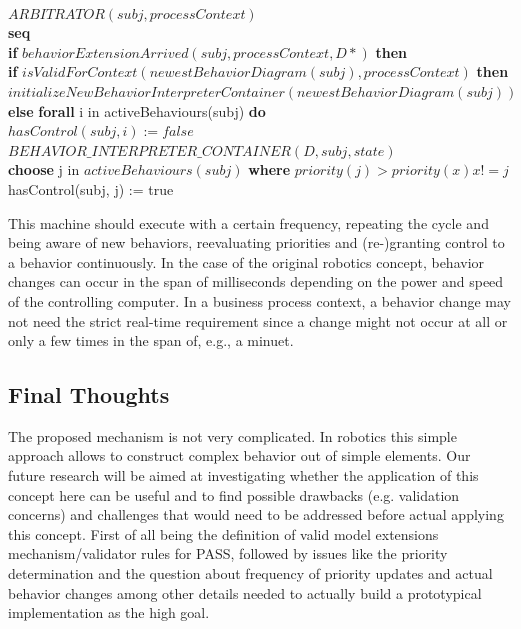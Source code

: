 {\newcommand\tab[1][1cm]{\hspace*{#1}}\begin{small}\begin{textit} \noindent  \\
$ARBITRATOR(subj, processContext)$ \\
    \indent\textbf{seq}\\
	\indent \textbf{if} $behaviorExtensionArrived(subj, processContext, D*)$ \textbf{then} \\
	\tab \textbf{if} $isValidForContext(newestBehaviorDiagram(subj), processContext)$ \textbf{then} \\		
         \indent \tab $initializeNewBehaviorInterpreterContainer(newestBehaviorDiagram(subj))$
	\indent \textbf{else} \textbf{forall}  i in activeBehaviours(subj) \textbf{do } \\
	     \tab  $hasControl(subj, i) := false$ \\
	     \tab $BEHAVIOR\_INTERPRETER\_CONTAINER(D, subj, state)$ \\
	  \indent \textbf{choose} j in $activeBehaviours(subj)$ \textbf{where} $priority(j) > priority(x){x != j}$ \\
	 	  \tab hasControl(subj, j) := true

\end{textit}\end{small}}
\bigskip

This machine should execute with a certain frequency, repeating the cycle and being aware of new behaviors, reevaluating priorities and (re-)granting control to a behavior continuously. In the case of the original robotics concept, behavior changes can occur in the span of milliseconds depending on the power and speed of the controlling computer. In a business process context, a behavior change may not need the strict real-time requirement since a change might not occur at all or only a few times in the span of, e.g., a minuet.

\subsection{Final Thoughts}

The proposed mechanism is not very complicated. In robotics this simple approach allows to construct complex behavior out of simple elements.  Our future research will be aimed at investigating whether the application of this concept here can be useful and to find possible drawbacks (e.g. validation concerns) and challenges that would need to be addressed before actual applying this concept. First of all being the definition of valid model extensions mechanism/validator rules for PASS, followed by issues like the priority determination and the question about frequency of priority updates and actual behavior changes among other details needed to actually build a prototypical implementation as the high goal. 

